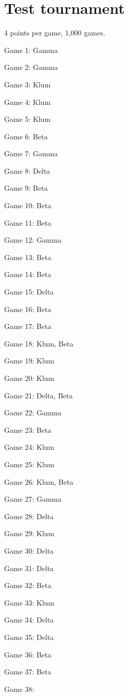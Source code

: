 \documentclass{article}
\begin{document}
\section{Test tournament}
4 points per game, 1,000 games.
\begin{multicols}{3}\raggedcolumns
\begin{compactitem}
\item Game 1:
Gamma
\item Game 2:
Gamma
\item Game 3:
Klum
\item Game 4:
Klum
\item Game 5:
Klum
\item Game 6:
Beta
\item Game 7:
Gamma
\item Game 8:
Delta
\item Game 9:
Beta
\item Game 10:
Beta
\item Game 11:
Beta
\item Game 12:
Gamma
\item Game 13:
Beta
\item Game 14:
Beta
\item Game 15:
Delta
\item Game 16:
Beta
\item Game 17:
Beta
\item Game 18:
Klum, Beta
\item Game 19:
Klum
\item Game 20:
Klum
\item Game 21:
Delta, Beta
\item Game 22:
Gamma
\item Game 23:
Beta
\item Game 24:
Klum
\item Game 25:
Klum
\item Game 26:
Klum, Beta
\item Game 27:
Gamma
\item Game 28:
Delta
\item Game 29:
Klum
\item Game 30:
Delta
\item Game 31:
Delta
\item Game 32:
Beta
\item Game 33:
Klum
\item Game 34:
Delta
\item Game 35:
Delta
\item Game 36:
Beta
\item Game 37:
Beta
\item Game 38:

\end{compactitem}
\end{multicols}
\end{document}
